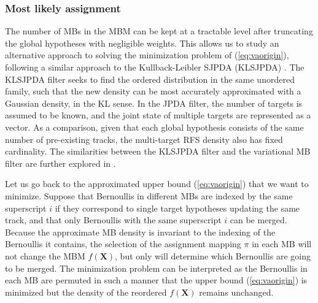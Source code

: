\documentclass[journal]{IEEEtran}
\begin{document}





\subsubsection{Most likely assignment}

The number of MBs in the MBM can be kept at a tractable level after truncating the global hypotheses with negligible weights. This allows us to study an alternative approach to solving the minimization problem of (\ref{eq:vaorigin}), following a similar approach to the Kullback-Leibler SJPDA (KLSJPDA) \cite{sjpda}. The KLSJPDA filter seeks to find the ordered distribution in the same unordered family, such that the new density can be most accurately approximated with a Gaussian density, in the KL sense. In the JPDA filter, the number of targets is assumed to be known, and the joint state of multiple targets are represented as a vector. As a comparison, given that each global hypothesis consists of the same number of pre-existing tracks, the multi-target RFS density also has fixed cardinality. The similarities between the KLSJPDA filter and the variational MB filter are further explored in \cite{variational}.

Let us go back to the approximated upper bound (\ref{eq:vaorigin}) that we want to minimize. Suppose that Bernoullis in different MBs are indexed by the same superscript $i$ if they correspond to single target hypotheses updating the same track, and that only Bernoullis with the same superscript $i$ can be merged. Because the approximate MB density is invariant to the indexing of the Bernoullis it contains, the selection of the assignment mapping $\pi$ in each MB will not change the MBM $f(\mathbf{X})$, but only will determine which Bernoullis are going to be merged. The minimization problem can be interpreted as the Bernoullis in each MB are permuted in such a manner that the upper bound (\ref{eq:vaorigin}) is minimized but the density of the reordered $f(\mathbf{X})$ remains unchanged. 
\end{document}
